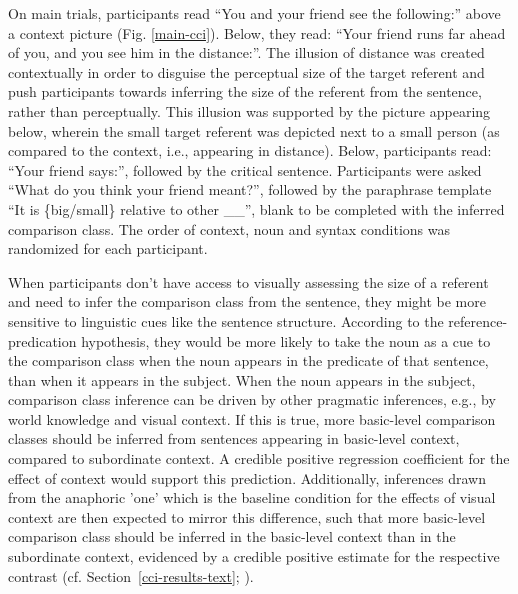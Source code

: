On main trials, participants read “You and your friend see the following:” above a context picture  (Fig. \ref{main-cci}). Below, they read: “Your friend runs far ahead of you, and you see him in the distance:”. The illusion of distance was created contextually in order to disguise the perceptual size of the target referent and push participants towards inferring the size of the referent from the sentence, rather than perceptually. This illusion was supported by the picture appearing below, wherein the small target referent was depicted next to a small person (as compared to the context, i.e., appearing in distance). Below, participants read: “Your friend says:”, followed by the critical sentence. Participants were asked “What do you think your friend meant?”, followed by the paraphrase template “It is \{big/small\} relative to other \_\_”, blank to be completed with the inferred comparison class. The order of context, noun and syntax conditions was randomized for each participant.

When participants don’t have access to visually assessing the size of a referent and need to infer the comparison class from the sentence, they might be more sensitive to linguistic cues like the sentence structure. According to the reference-predication hypothesis, they would be more likely to take the noun as a cue to the comparison class when the noun appears in the predicate of that sentence, than when it appears in the subject. 
When the noun appears in the subject, comparison class inference can be driven by other pragmatic inferences, e.g., by world knowledge and visual context. If this is true, more basic-level comparison classes should be inferred from sentences appearing in basic-level context, compared to subordinate context. A credible positive regression coefficient for the effect of context would support this prediction. Additionally, inferences drawn from the anaphoric 'one' which is the baseline condition for the effects of visual context are then expected to mirror this difference, such that more basic-level comparison class should be inferred in the basic-level context than in the subordinate context, evidenced by a credible positive estimate for the respective contrast (cf. Section~\ref{cci-results-text}; \textcite[cf.][]{goldberg2017one}).
 
